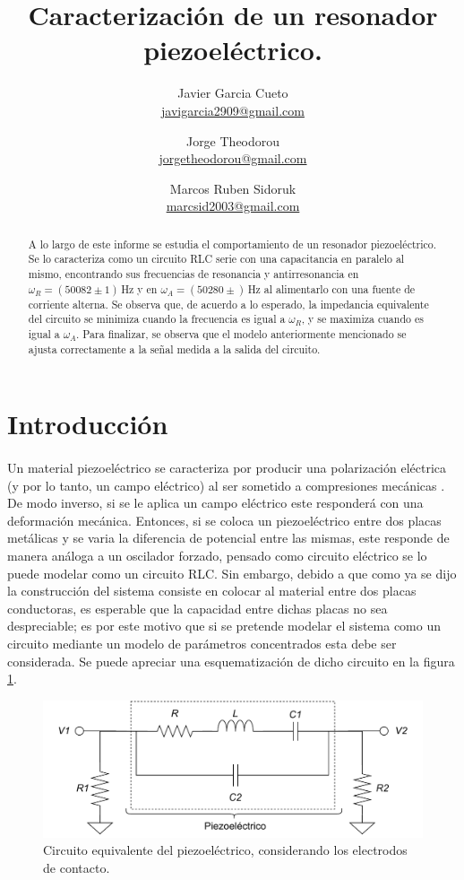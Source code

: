 \documentclass{article}
\title{Caracterización de un resonador piezoeléctrico.}
\author{
    Javier Garcia Cueto \\
    \href{mailto:javigarcia2909@gmail.com}{javigarcia2909@gmail.com} 
    \and 
    Jorge Theodorou \\
    \href{mailto:jorgetheodorou@gmail.com}{jorgetheodorou@gmail.com}
    \and 
    Marcos Ruben Sidoruk \\
    \href{mailto:marcsid2003@gmail.com}{marcsid2003@gmail.com} 
}
\begin{document}
\maketitle

\begin{abstract}
A lo largo de este informe se estudia el comportamiento de un resonador
    piezoeléctrico. Se lo caracteriza como un circuito RLC serie con una
    capacitancia en paralelo al mismo, encontrando sus frecuencias de
    resonancia y antirresonancia en $\omega_R=(50082\pm1)\,$Hz y en
    $\omega_A=(50280\pm)\,$Hz al alimentarlo con una fuente de corriente
    alterna. Se observa que, de acuerdo a lo esperado, la impedancia
    equivalente del circuito se minimiza cuando la frecuencia es igual a
    $\omega_R$, y se maximiza cuando es igual a $\omega_A$. Para finalizar, se
    observa que el modelo anteriormente mencionado se ajusta correctamente a la
    señal medida a la salida del circuito.
\end{abstract}

\section{Introducción} 

\paragraph{} 
Un material piezoeléctrico se caracteriza por producir una
polarización eléctrica (y por lo tanto, un campo eléctrico) al ser sometido a
compresiones mecánicas \cite{guia_piezoelectrico}. De modo inverso, si se le
aplica un campo eléctrico este responderá con una deformación mecánica.
Entonces, si se coloca un piezoeléctrico entre dos placas metálicas y se varia
la diferencia de potencial entre las mismas, este responde de manera análoga a
un oscilador forzado, pensado como circuito eléctrico se lo puede modelar como
un circuito RLC. Sin embargo, debido a que como ya se dijo la construcción del
sistema consiste en colocar al material entre dos placas conductoras, es
esperable que la capacidad entre dichas placas no sea despreciable; es por este
motivo que si se pretende modelar el sistema como un circuito mediante un
modelo de parámetros concentrados esta debe ser considerada. Se puede apreciar
una esquematización de dicho circuito en la figura \ref{Circuito equivalente}. 

\begin{figure}[H]
    \centering
    \includegraphics[width=16cm]{Circuito equivalente.drawio.pdf}
    \caption{Circuito equivalente del piezoeléctrico, considerando los
    electrodos de contacto.}
    \label{Circuito equivalente}
\end{figure}
\end{document}
